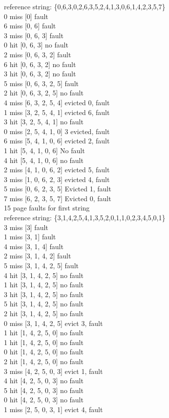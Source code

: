 \documentclass{assignment}
\begin{document}
reference string: \{0,6,3,0,2,6,3,5,2,4,1,3,0,6,1,4,2,3,5,7\} \\
0  miss  [0]  fault \\ 
6 miss  [0, 6]  fault \\ 
3  miss  [0, 6, 3]  fault \\
0  hit  [0, 6, 3]  no fault \\
2  miss  [0, 6, 3, 2]  fault \\ 
6  hit  [0, 6, 3, 2]  no fault \\
3  hit  [0, 6, 3, 2]  no fault \\
5  miss  [0, 6, 3, 2, 5]  fault \\
2  hit  [0, 6, 3, 2, 5]  no fault \\ 
4  miss  [6, 3, 2, 5, 4]  evicted 0, fault \\
1  miss  [3, 2, 5, 4, 1]   evicted 6, fault \\
3  hit  [3, 2, 5, 4, 1]  no fault \\ 
0  miss  [2, 5, 4, 1, 0] 3 evicted, fault \\
6  miss  [5, 4, 1, 0, 6] evicted 2, fault \\
1  hit  [5, 4, 1, 0, 6]  No fault \\
4  hit  [5, 4, 1, 0, 6]  no fault \\ 
2  miss  [4, 1, 0, 6, 2] evicted 5, fault \\
3  miss  [1, 0, 6, 2, 3] evicted 4, fault \\
5  miss  [0, 6, 2, 3, 5] Evicted 1, fault \\
7  miss  [6, 2, 3, 5, 7] Evicted 0, fault  \\
15 page faults for first string \\

reference string: \{3,1,4,2,5,4,1,3,5,2,0,1,1,0,2,3,4,5,0,1\} \\
3 miss [3] fault \\
1 miss [3, 1] fault \\
4 miss [3, 1, 4] fault \\
2 miss [3, 1, 4, 2] fault \\
5 miss [3, 1, 4, 2, 5] fault \\
4 hit [3, 1, 4, 2, 5] no fault \\
1 hit [3, 1, 4, 2, 5] no fault \\
3 hit [3, 1, 4, 2, 5] no fault \\
5 hit [3, 1, 4, 2, 5] no fault \\
2 hit [3, 1, 4, 2, 5] no fault \\
0 miss [3, 1, 4, 2, 5] evict 3, fault \\
1 hit [1, 4, 2, 5, 0] no fault \\
1 hit [1, 4, 2, 5, 0] no fault \\
0 hit [1, 4, 2, 5, 0] no fault \\
2 hit [1, 4, 2, 5, 0] no fault \\
3 miss [4, 2, 5, 0, 3] evict 1, fault \\
4 hit [4, 2, 5, 0, 3] no fault \\
5 hit [4, 2, 5, 0, 3] no fault \\
0 hit [4, 2, 5, 0, 3] no fault \\
1 miss [2, 5, 0, 3, 1] evict 4, fault \\
\end{document}
